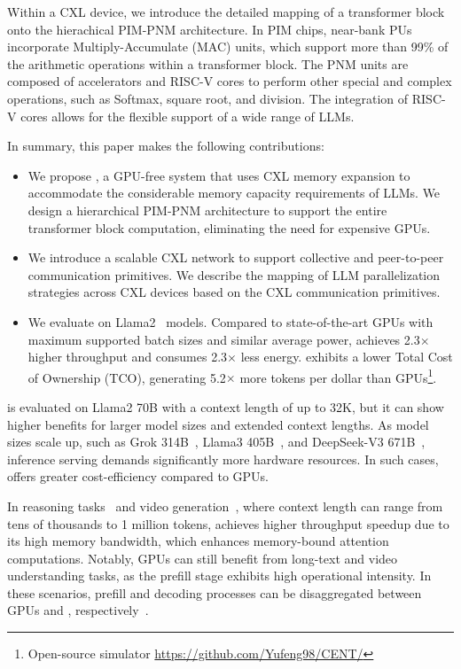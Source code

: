 Within a CXL device, we introduce the detailed mapping of a transformer block onto the hierachical PIM-PNM architecture. 
In PIM chips, near-bank PUs incorporate Multiply-Accumulate (MAC) units, which support more than 99\% of the arithmetic operations within a transformer block. 
The PNM units are composed of accelerators and RISC-V cores to perform other special and complex operations, such as Softmax, square root, and division. The integration of RISC-V cores allows for the flexible support of a wide range of LLMs.


In summary, this paper makes the following contributions:
\begin{itemize}
\item We propose \att{}, a GPU-free system that uses CXL memory expansion to accommodate the considerable memory capacity requirements of LLMs. We design a hierarchical PIM-PNM architecture to support the entire transformer block computation, eliminating the need for expensive GPUs.

\item We introduce a scalable CXL network to support collective and peer-to-peer communication primitives.
We describe the mapping of LLM parallelization strategies across CXL devices based on the CXL communication primitives.

\item We evaluate \att{} on Llama2~\cite{touvron2023llama} models. 
Compared to state-of-the-art GPUs with maximum supported batch sizes and similar average power, \att{} achieves 2.3$\times$ higher throughput and consumes 2.3$\times$ less energy. 
\att{} exhibits a lower Total Cost of Ownership (TCO), generating 5.2$\times$ more tokens per dollar than GPUs\footnote{Open-source \att{} simulator \href{https://github.com/Yufeng98/CENT/}{https://github.com/Yufeng98/CENT/}}.
\end{itemize}

\att{} is evaluated on Llama2 70B with a context length of up to 32K, but it can show higher benefits for larger model sizes and extended context lengths. As model sizes scale up, such as Grok 314B~\cite{grok}, Llama3 405B~\cite{llama3}, and DeepSeek-V3 671B~\cite{deepseek-v3}, inference serving demands significantly more hardware resources. In such cases, \att{} offers greater cost-efficiency compared to GPUs.


In reasoning tasks~\cite{O1-reasoning, deepseek-r1} and video generation~\cite{sora, polyak2024movie, gemini-pro}, where context length can range from tens of thousands to 1 million tokens, \att{} achieves higher throughput speedup due to its high memory bandwidth, which enhances memory-bound attention computations. Notably, GPUs can still benefit from long-text and video understanding tasks, as the prefill stage exhibits high operational intensity. In these scenarios, prefill and decoding processes can be disaggregated between GPUs and \att{}, respectively~\cite{zhong2024distserve, patel2024splitwise}.